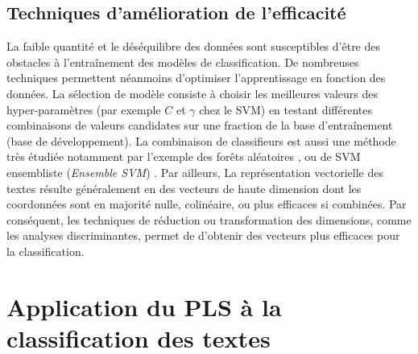 \subsection{Techniques d'amélioration de l'efficacité}
La faible quantité \citep{ruparel2013smalldataclass} et le déséquilibre des données sont susceptibles d'être des obstacles à l'entraînement des modèles de classification. De nombreuses techniques permettent néanmoins d'optimiser l'apprentissage en fonction des données. La sélection de modèle consiste à choisir les meilleures valeurs des hyper-paramètres (par exemple $C$ et $\gamma$ chez le SVM) en testant différentes combinaisons de valeurs candidates sur une fraction de la base d'entraînement (base de développement). La combinaison de classifieurs est aussi une méthode très étudiée \citep{kittler1996combiningclassifiers,kuncheva2004combiningclassifiers, tulyakov2008combiningclassifiers} notamment par l'exemple des forêts aléatoires \citep{breiman2001randomforest}, ou de SVM ensembliste (\textit{Ensemble SVM}) \citep{dong2005ensembleSVM}.
Par ailleurs, La représentation vectorielle des textes résulte généralement en des vecteurs de haute dimension dont les  coordonnées sont en majorité nulle, colinéaire, ou plus efficaces si combinées. Par conséquent, les techniques de réduction ou transformation des dimensions, comme les analyses discriminantes, permet de d'obtenir des vecteurs plus efficaces pour la classification.

\section{Application du PLS  à la classification des textes}
\label{sec:sensresultat:pls}

